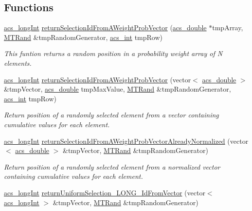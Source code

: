 \subsection*{Functions}
\begin{DoxyCompactItemize}
\item 
\hyperlink{a00066_a19319d75f02db4308bc5c0026d98cd85}{acs\-\_\-long\-Int} \hyperlink{a00069_aa6403f90846f5fb19fcfb8b81aeee73c}{return\-Selection\-Id\-From\-A\-Weight\-Prob\-Vector} (\hyperlink{a00066_ab776853a005fcbf56af0424a2a4dd607}{acs\-\_\-double} $\ast$tmp\-Array, \hyperlink{a00008}{M\-T\-Rand} \&tmp\-Random\-Generator, \hyperlink{a00066_a8d277355641a098190360234e2ebde35}{acs\-\_\-int} tmp\-Row)
\begin{DoxyCompactList}\small\item\em This funtion returns a random position in a probability weight array of N elements. \end{DoxyCompactList}\item 
\hyperlink{a00066_a19319d75f02db4308bc5c0026d98cd85}{acs\-\_\-long\-Int} \hyperlink{a00069_a308bfda14afb58f5ffa8b872c8bcc64e}{return\-Selection\-Id\-From\-A\-Weight\-Prob\-Vector} (vector$<$ \hyperlink{a00066_ab776853a005fcbf56af0424a2a4dd607}{acs\-\_\-double} $>$ \&tmp\-Vector, \hyperlink{a00066_ab776853a005fcbf56af0424a2a4dd607}{acs\-\_\-double} tmp\-Max\-Value, \hyperlink{a00008}{M\-T\-Rand} \&tmp\-Random\-Generator, \hyperlink{a00066_a8d277355641a098190360234e2ebde35}{acs\-\_\-int} tmp\-Row)
\begin{DoxyCompactList}\small\item\em Return position of a randomly selected element from a vector containing cumulative values for each element. \end{DoxyCompactList}\item 
\hyperlink{a00066_a19319d75f02db4308bc5c0026d98cd85}{acs\-\_\-long\-Int} \hyperlink{a00069_a4135ff15fd24eb8fbfee3d00e1cfbf20}{return\-Selection\-Id\-From\-A\-Weight\-Prob\-Vector\-Already\-Normalized} (vector$<$ \hyperlink{a00066_ab776853a005fcbf56af0424a2a4dd607}{acs\-\_\-double} $>$ \&tmp\-Vector, \hyperlink{a00008}{M\-T\-Rand} \&tmp\-Random\-Generator)
\begin{DoxyCompactList}\small\item\em Return position of a randomly selected element from a normalized vector containing cumulative values for each element. \end{DoxyCompactList}\item 
\hyperlink{a00066_a19319d75f02db4308bc5c0026d98cd85}{acs\-\_\-long\-Int} \hyperlink{a00069_a1cb9cc6ac8ec2ef62b8eb1970e73a11b}{return\-Uniform\-Selection\-\_\-\-L\-O\-N\-G\-\_\-\-Id\-From\-Vector} (vector$<$ \hyperlink{a00066_a19319d75f02db4308bc5c0026d98cd85}{acs\-\_\-long\-Int} $>$ \&tmp\-Vector, \hyperlink{a00008}{M\-T\-Rand} \&tmp\-Random\-Generator)

\end{DoxyCompactItemize}
